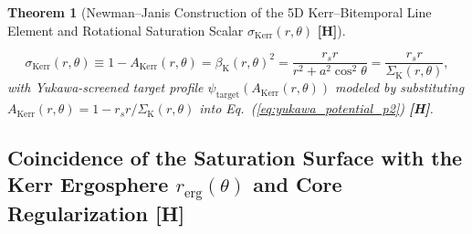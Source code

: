 \documentclass[11pt,a4paper]{article}
\newcommand{\catH}{\textbf{\textcolor{orange!85!black}{[H]}}}
\theoremstyle{plain}
\newtheorem{theorem}{Theorem}[section]
\theoremstyle{definition}
\theoremstyle{remark}
\numberwithin{equation}{section}
\begin{document}
\begin{theorem}[Newman--Janis Construction of the 5D Kerr--Bitemporal Line Element and Rotational Saturation Scalar $\sigma_{\text{Kerr}}(r,\theta)$ \catH]
\begin{enumerate}
  \begin{equation}
    \sigma_{\text{Kerr}}(r, \theta) \equiv 1 - A_{\text{Kerr}}(r, \theta) = \beta_{\text{K}}(r, \theta)^2 = \frac{r_s r}{r^2 + a^2\cos^2\theta} = \frac{r_s r}{\Sigma_{\text{K}}(r, \theta)},
    \label{eq:sigma_kerr_exact}
  \end{equation}
  with Yukawa-screened target profile $\psi_{\text{target}}(A_{\text{Kerr}}(r,\theta))$ modeled by substituting $A_{\text{Kerr}}(r,\theta) = 1 - r_s r/\Sigma_{\text{K}}(r,\theta)$ into Eq.~(\ref{eq:yukawa_potential_p2}) \catH.
\end{enumerate}
\end{theorem}

\subsection{\texorpdfstring{Coincidence of the Saturation Surface with the Kerr Ergosphere $r_{\text{erg}}(\theta)$ and Core Regularization \catH}{Coincidence of the Saturation Surface with the Kerr Ergosphere and Core Regularization}}
\end{document}
